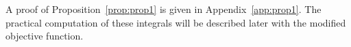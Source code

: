 \begin{proposition}
\end{proposition}
A proof of Proposition~\ref{prop:prop1} is given in Appendix~\ref{app:prop1}. 
The practical computation of these integrals
will be described later with the modified objective function.



